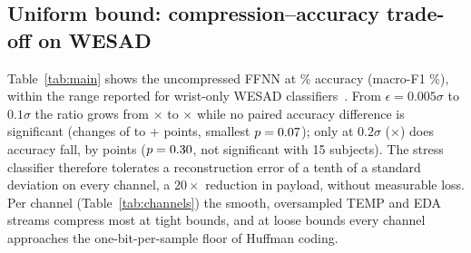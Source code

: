 \documentclass[journal,twoside,web]{ieeecolor}
\begin{document}
\subsection{Uniform bound: compression--accuracy trade-off on WESAD}
\begin{table}[t]
\caption{WESAD, uniform bound: ratio and LOSO accuracy of the proposed codec (matched; mean $\pm$ 95\% CI over 15 subjects; $p$: Wilcoxon vs.\ uncompressed).}
\label{tab:main}
\centering\scriptsize
\resizebox{\columnwidth}{!}{}
\end{table}
\begin{table}[t]
\caption{WESAD baselines. Top: error-bounded methods at each uniform $\epsilon$ (ratio, accuracy change in points, realized worst-case error for ZFP). Bottom: methods without a tunable bound (ratio, matched $\Delta$Acc., mismatched accuracy).}
\label{tab:baselines}
\centering\scriptsize
\resizebox{\columnwidth}{!}{}
\end{table}
\begin{table}[t]
\caption{WESAD: per-channel ratio at each uniform bound and worst-case $\max|\hat{x}-x|/\epsilon$ over all subjects and samples.}
\label{tab:channels}
\centering\scriptsize
\resizebox{\columnwidth}{!}{}
\end{table}

Table~\ref{tab:main} shows the uncompressed FFNN at \rawAcc\% accuracy (macro-F1 \rawF\%), within the range reported for wrist-only WESAD classifiers~\cite{sipele2023}. From $\epsilon=0.005\sigma$ to $0.1\sigma$ the ratio grows from \ratioEa$\times$ to \ratioEe$\times$ while no paired accuracy difference is significant (changes of \dAccEa{} to +\dAccEe{} points, smallest $p=0.07$); only at $0.2\sigma$ (\ratioEf$\times$) does accuracy fall, by \dAccEf{} points ($p=0.30$, not significant with 15 subjects). The stress classifier therefore tolerates a reconstruction error of a tenth of a standard deviation on every channel, a $20\times$ reduction in payload, without measurable loss. Per channel (Table~\ref{tab:channels}) the smooth, oversampled TEMP and EDA streams compress most at tight bounds, and at loose bounds every channel approaches the one-bit-per-sample floor of Huffman coding.
\end{document}
